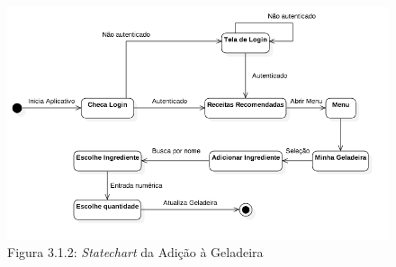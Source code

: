 \documentclass{article}
\begin{document}
\begin{figure}[h!]
  \centering
	\includegraphics[scale=0.5]{state_charts/adicionaingrediente.png}
  \captionsetup{labelformat=empty}
  \caption{Figura 3.1.2: \emph{Statechart} da Adição à Geladeira}
\end{figure}

\begin{figure}[h!]
\end{figure}
\end{document}
